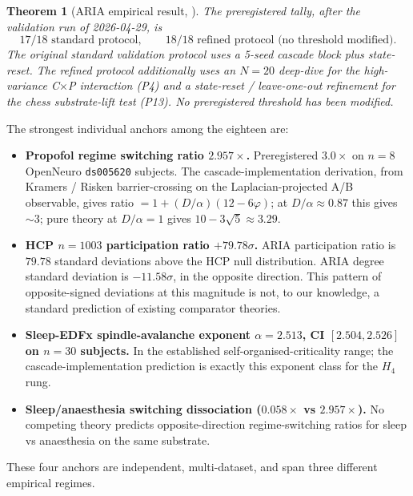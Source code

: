 \documentclass[11pt]{article}
\theoremstyle{plain}
\newtheorem{theorem}{Theorem}[section]
\theoremstyle{definition}
\theoremstyle{remark}
\begin{document}
\begin{theorem}[ARIA empirical result, \citet{SmartAriaChess2026}]\label{thm:aria-witness}
The preregistered tally, after the validation run of 2026-04-29, is
\begin{equation*}
  17/18 \text{ standard protocol},  \qquad 18/18 \text{ refined protocol (no threshold modified)}.
\end{equation*}
The original standard validation protocol uses a 5-seed cascade block plus state-reset. The refined protocol additionally uses an $N = 20$ deep-dive for the high-variance C$\times$P interaction (P4) and a state-reset / leave-one-out refinement for the chess substrate-lift test (P13). No preregistered threshold has been modified.
\end{theorem}

The strongest individual anchors among the eighteen are:

\begin{itemize}[leftmargin=2em]
\item \textbf{Propofol regime switching ratio $2.957 \times$.} Preregistered $3.0 \times$ on $n = 8$ OpenNeuro \texttt{ds005620} subjects. The cascade-implementation derivation, from Kramers / Risken barrier-crossing on the Laplacian-projected A/B observable, gives ratio $= 1 + (D/\alpha)(12 - 6\varphi)$; at $D/\alpha \approx 0.87$ this gives $\sim 3$; pure theory at $D/\alpha = 1$ gives $10 - 3\sqrt{5} \approx 3.29$.
\item \textbf{HCP $n = 1003$ participation ratio $+79.78\sigma$.} ARIA participation ratio is $79.78$ standard deviations above the HCP null distribution. ARIA degree standard deviation is $-11.58\sigma$, in the opposite direction. This pattern of opposite-signed deviations at this magnitude is not, to our knowledge, a standard prediction of existing comparator theories.
\item \textbf{Sleep-EDFx spindle-avalanche exponent $\alpha = 2.513$, CI $[2.504, 2.526]$ on $n = 30$ subjects.} In the established self-organised-criticality range; the cascade-implementation prediction is exactly this exponent class for the $H_4$ rung.
\item \textbf{Sleep/anaesthesia switching dissociation ($0.058\times$ vs $2.957\times$).} No competing theory predicts opposite-direction regime-switching ratios for sleep vs anaesthesia on the same substrate.
\end{itemize}

These four anchors are independent, multi-dataset, and span three different empirical regimes.
\end{document}
